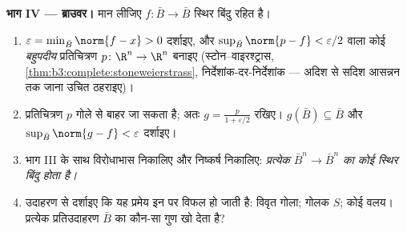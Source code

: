 \begin{problem}[{सप्ताहांत समस्या --- कोई प्रत्याकर्षण नहीं, कोई
पलायन नहीं}]
\medskip
\noindent\textbf{भाग IV ---  ब्राउवर।} मान लीजिए $f\colon\bar B\to\bar B$ स्थिर
बिंदु रहित  है।
\begin{enumerate}[resume]
  \item $\varepsilon = \min_{\bar B}\norm{f - x} > 0$ दर्शाइए, और $\sup_{\bar B}\norm{p - f} <
        \varepsilon/2$ वाला कोई \emph{बहुपदीय}
        प्रतिचित्रण $p\colon\R^n\to
        \R^n$ बनाइए (स्टोन--वाइरश्ट्रास, \cref{thm:b3:complete:stoneweierstrass},
        निर्देशांक-दर-निर्देशांक --- अदिश से सदिश आसन्नन तक जाना
        उचित ठहराइए)।
  \item प्रतिचित्रण $p$ गोले से बाहर जा सकता है; अतः $g = \frac{p}{1
        + \varepsilon/2}$
        रखिए। $g(\bar B) \subseteq \bar B$ और $\sup_{\bar B}\norm{g - f} < \varepsilon$ दर्शाइए।
  \item भाग III के साथ विरोधाभास निकालिए और निष्कर्ष निकालिए:
        \emph{प्रत्येक  $\bar B^n \to \bar B^n$ का कोई स्थिर बिंदु
        होता है।}
  \item उदाहरण से दर्शाइए कि यह प्रमेय इन पर विफल हो जाती है:
        विवृत गोला; गोलक $S$; कोई  वलय। प्रत्येक
        प्रतिउदाहरण $\bar B$ का कौन-सा गुण खो देता है?
\end{enumerate}


\end{problem}
